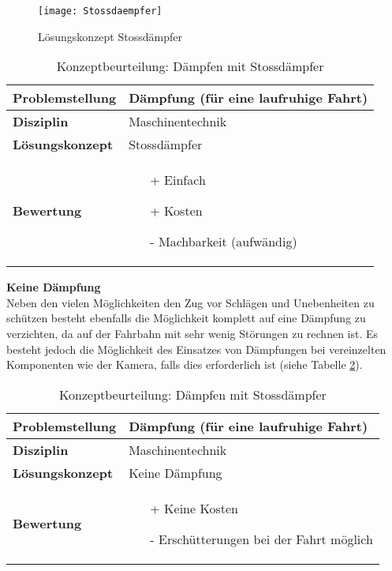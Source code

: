 \documentclass[../../main.tex]{subfiles}
\begin{document}
  \begin{figure}[H] %
    \centering
    \texttt{[image: Stossdaempfer]}
    \caption{Lösungskonzept Stossdämpfer}
    \label{fig:stossdaempfer}
  \end{figure}

  \begin{flushleft}
    \begin{table}[h]
    \begin{tabular}{ | l | p{11cm} |}
    \hline
    \textbf{Problemstellung} & Dämpfung (für eine laufruhige Fahrt) \\ \hline
    \textbf{Disziplin} & Maschinentechnik \\ \hline
    \textbf{Lösungskonzept} & Stossdämpfer \\ \hline
    \textbf{Bewertung} &  \begin{itemize}
                            \item[+] Einfach
                            \item[+] Kosten
                            \item[-] Machbarkeit (aufwändig)
                          \end{itemize} \\ \hline
    \end{tabular}
    \caption{Konzeptbeurteilung: Dämpfen mit Stossdämpfer}
    \label{tab:stossdaempfer}
\end{table}
\end{flushleft}

\textbf{Keine Dämpfung}\\
Neben den vielen Möglichkeiten den Zug vor Schlägen und Unebenheiten zu schützen besteht ebenfalls die Möglichkeit komplett auf eine Dämpfung zu verzichten, da auf der Fahrbahn mit sehr wenig Störungen zu rechnen ist. Es besteht jedoch die Möglichkeit des Einsatzes von Dämpfungen bei vereinzelten Komponenten wie der Kamera, falls dies erforderlich ist (siehe Tabelle \ref{tab:keinedaempfung}).

\begin{flushleft}
    \begin{table}[h]
    \begin{tabular}{ | l | p{11cm} |}
    \hline
    \textbf{Problemstellung} & Dämpfung (für eine laufruhige Fahrt) \\ \hline
    \textbf{Disziplin} & Maschinentechnik \\ \hline
    \textbf{Lösungskonzept} & Keine Dämpfung \\ \hline
    \textbf{Bewertung} &  \begin{itemize}
                            \item[+] Keine Kosten
                            \item[-] Erschütterungen bei der Fahrt möglich
                          \end{itemize} \\ \hline
    \end{tabular}
    \caption{Konzeptbeurteilung: Dämpfen mit Stossdämpfer}
    \label{tab:keinedaempfung}
\end{table}
\end{flushleft}
\end{document}
